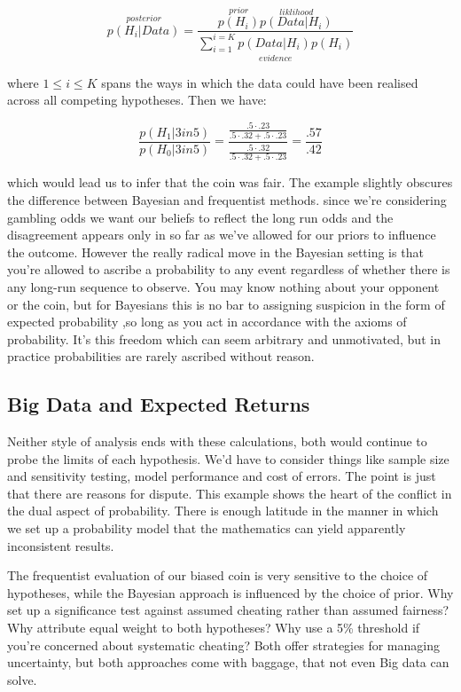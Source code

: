 \documentclass[10pt,a4paper,notitlepage, twocolumn]{article}
\begin{document}
$$ \overset{posterior}{p(H_{i} | Data)} = \frac{\overset{prior}{p(H_{i})}\overset{liklihood}{p(Data | H_{i})}}{\underset{evidence}{\sum_{i=1}^{i =K} p(Data | H_{i})p(H_i)}}$$

where $ 1 \leq i \leq K$ spans the ways in which the data could have been realised across all competing hypotheses. Then we have:

$$ \frac{p(H_1 | 3 in 5)}{p(H_{0} | 3 in 5)} = \frac{\frac{.5\cdot .23}{.5\cdot .32 + .5 \cdot .23}}{\frac{.5\cdot .32}{.5\cdot .32 + .5 \cdot .23}} = \frac{.57}{.42} $$

which would lead us to infer that the coin was fair. The example slightly obscures the difference between Bayesian and frequentist methods. since we're considering gambling odds we want our beliefs to reflect the long run odds and the disagreement appears only in so far as we've allowed for our priors to influence the outcome. However the really radical move in the Bayesian setting is that you're allowed to ascribe a probability to any event regardless of whether there is any long-run sequence to observe. You may know nothing about your opponent or the coin, but for Bayesians this is no bar to assigning suspicion in the form of expected probability ,so long as you act in accordance with the axioms of probability. It's this freedom which can seem arbitrary and unmotivated, but in practice probabilities  are rarely ascribed without reason.

\raggedbottom

\subsection*{Big Data and Expected Returns}
Neither style of analysis ends with these calculations, both would continue to probe the limits of each hypothesis. We'd have to consider things like sample size and sensitivity testing, model performance and cost of errors. The point is just that there are reasons for dispute. This example shows the heart of the conflict in the dual aspect of probability. There is enough latitude in the manner in which we set up a probability model that the mathematics can yield apparently inconsistent results. 

The frequentist evaluation of our biased coin is very sensitive to the choice of hypotheses, while the Bayesian approach is influenced by the choice of prior. Why set up a significance test against assumed cheating rather than assumed fairness? Why attribute equal weight to both hypotheses? Why use a 5\% threshold if you're concerned about systematic cheating? Both offer strategies for managing uncertainty, but both approaches come with baggage, that not even Big data can solve.
\newline 
\end{document}
